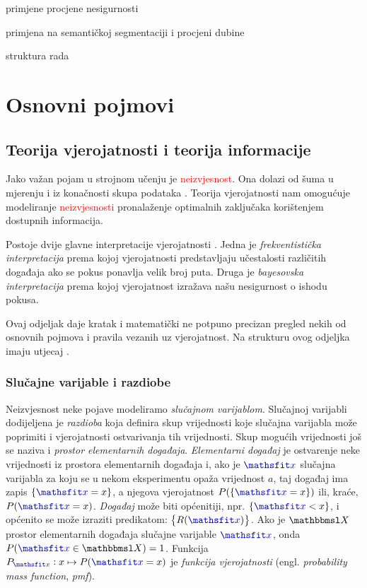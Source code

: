 \documentclass[utf8, diplomski, lmodern]{fer}
\begin{document}
primjene procjene nesigurnosti

primjena na semantičkoj segmentaciji i procjeni dubine

struktura rada



\chapter{Osnovni pojmovi} \label{chap:osnovni-pojmovi}


\section{Teorija vjerojatnosti i teorija informacije}

Jako važan pojam u strojnom učenju je \textcolor{red}{neizvjesnost}. Ona dolazi od šuma u mjerenju i iz konačnosti skupa podataka \citep{Bishop:2006:PRML}. Teorija vjerojatnosti nam omogućuje modeliranje \textcolor{red}{neizvjesnosti} pronalaženje optimalnih zaključaka korištenjem dostupnih informacija.

Postoje dvije glavne interpretacije vjerojatnosti \citep{Murphy:2012:MLPP}. Jedna je \emph{frekventistička interpretacija} prema kojoj vjerojatnosti predstavljaju učestalosti različitih događaja ako se pokus ponavlja velik broj puta. Druga je \emph{bayesovska interpretacija} prema kojoj vjerojatnost izražava našu nesigurnost o ishodu pokusa. 
 
Ovaj odjeljak daje kratak i matematički ne potpuno precizan pregled nekih od osnovnih pojmova i pravila vezanih uz vjerojatnost. Na strukturu ovog odjeljka imaju utjecaj \cite{Goodfellow:2016:DL,Murphy:2012:MLPP}.

\subsection{Slučajne varijable i razdiobe}

Neizvjesnost neke pojave modeliramo \emph{slučajnom varijablom}. Slučajnoj varijabli dodijeljena je \emph{razdioba} koja definira skup vrijednosti koje slučajna varijabla može poprimiti i vjerojatnosti ostvarivanja tih vrijednosti. Skup mogućih vrijednosti još se naziva i \emph{prostor elementarnih događaja}. \emph{Elementarni događaj} je ostvarenje neke vrijednosti iz prostora elementarnih događaja i, ako je $\rvar x$ slučajna varijabla za koju se u nekom eksperimentu opaža vrijednost $a$, taj događaj ima zapis $\cbr{\rvar x = x}$, a njegova vjerojatnost $P(\cbr{\rvar x = x})$ ili, kraće, $P(\rvar x = x)$. \emph{Događaj} može biti općenitiji, npr. $\cbr{\rvar x < x}$, i općenito se može izraziti predikatom: $\cbr{R(\rvar x)}$. Ako je $\set X$ prostor elementarnih događaja slučajne varijable $\rvar x$, onda $P(\rvar x\in \set X)=1$. Funkcija $P_{\rvar x}:x\mapsto P(\rvar x=x)$ je \emph{funkcija vjerojatnosti} (engl. \textit{probability mass function}, \textit{pmf}).
\end{document}
